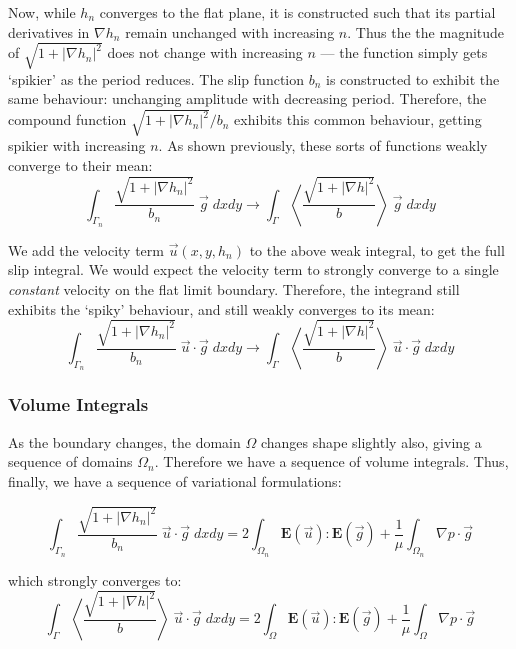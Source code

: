 \documentclass[12pt, a4paper, twoside, openright]{book}
\begin{document}
Now, while $h_n$ converges to the flat plane, it is constructed such that its partial derivatives in $\nabla h_n$ remain unchanged with increasing $n$.
Thus the the magnitude of $\sqrt{1 + \lvert \nabla h_n \rvert^2}$ does not change with increasing $n$ --- the function simply gets `spikier' as the period reduces.
The slip function $b_n$ is constructed to exhibit the same behaviour: unchanging amplitude with decreasing period.
Therefore, the compound function $\sqrt{1 + \lvert \nabla h_n \rvert^2} /b_n$ exhibits this common behaviour, getting spikier with increasing $n$.
As shown previously, these sorts of functions weakly converge to their mean:
\begin{equation}
\int_{\Gamma_n} \frac{\sqrt{1 + \lvert \nabla h_n \rvert^2}}{b_n} \;
\vec{g}\;dxdy \to
\int_{\Gamma} \left< \frac{\sqrt{1 + \lvert \nabla h \rvert^2}}{b} \right> \;
\vec{g} \;dxdy
\end{equation}

We add the velocity term $\vec{u}(x,y,h_n)$ to the above weak integral, to get the full slip integral.  
We would expect the velocity term to strongly converge to a single \emph{constant} velocity on the flat limit boundary.  Therefore, the integrand still exhibits the `spiky' behaviour, and still weakly converges to its mean:
\begin{equation}
\int_{\Gamma_n} \frac{\sqrt{1 + \lvert \nabla h_n \rvert^2}}{b_n} \;
\vec{u} \cdot \vec{g}\;dxdy \to
\int_{\Gamma} \left< \frac{\sqrt{1 + \lvert \nabla h \rvert^2}}{b} \right> \;
\vec{u} \cdot \vec{g} \;dxdy
\end{equation}

\subsubsection*{Volume Integrals}

As the boundary changes, the domain $\Omega$ changes shape slightly also, giving a sequence of domains $\Omega_n$.  Therefore we have a sequence of volume integrals.  Thus, finally, we have a sequence of variational formulations:

\begin{equation}
\int_{\Gamma_n} \frac{\sqrt{1 + \lvert \nabla h_n \rvert^2}}{b_n} \;
\vec{u} \cdot \vec{g}\;dxdy = 
2 \int_{\Omega_n} \mathbf{E}(\vec{u}) : \mathbf{E}(\vec{g}) +
\frac{1}{\mu} \int_{\Omega_n}  \nabla p \cdot \vec{g}
\end{equation}

which strongly converges to:
\begin{equation}
\int_{\Gamma} \left< \frac{\sqrt{1 + \lvert \nabla h \rvert^2}}{b} \right> \;
\vec{u} \cdot \vec{g} \;dxdy = 
2 \int_{\Omega} \mathbf{E}(\vec{u}) : \mathbf{E}(\vec{g}) +
\frac{1}{\mu} \int_{\Omega}  \nabla p \cdot \vec{g}
\end{equation}
\end{document}
